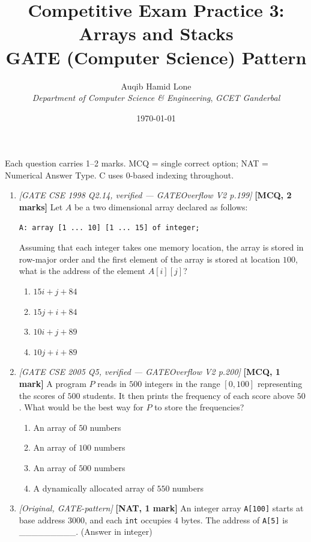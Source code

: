 \documentclass[11pt]{article}
\title{Competitive Exam Practice 3: Arrays and Stacks\\\large GATE (Computer Science) Pattern}
\author{Auqib Hamid Lone\\[0.3em]
  \emph{Department of Computer Science \& Engineering}, \emph{GCET Ganderbal}}
\date{\today}
\begin{document}
\maketitle

\noindent Each question carries 1--2 marks. MCQ = single correct option; NAT = Numerical Answer Type. C uses 0-based indexing throughout.

\begin{enumerate}
\item[\textbf{Q1}] \textit{[GATE CSE 1998 Q2.14, verified --- GATEOverflow V2 p.199]} \textbf{[MCQ, 2 marks]} Let $A$ be a two dimensional array declared as follows:
\begin{verbatim}
A: array [1 ... 10] [1 ... 15] of integer;
\end{verbatim}
Assuming that each integer takes one memory location, the array is stored in row-major order and the first element of the array is stored at location $100$, what is the address of the element $A[i][j]$?
\begin{enumerate}
  \item[(A)] $15i + j + 84$
  \item[(B)] $15j + i + 84$
  \item[(C)] $10i + j + 89$
  \item[(D)] $10j + i + 89$
\end{enumerate}

\item[\textbf{Q2}] \textit{[GATE CSE 2005 Q5, verified --- GATEOverflow V2 p.200]} \textbf{[MCQ, 1 mark]} A program $P$ reads in $500$ integers in the range $[0, 100]$ representing the scores of $500$ students. It then prints the frequency of each score above $50$. What would be the best way for $P$ to store the frequencies?
\begin{enumerate}
  \item[(A)] An array of $50$ numbers
  \item[(B)] An array of $100$ numbers
  \item[(C)] An array of $500$ numbers
  \item[(D)] A dynamically allocated array of $550$ numbers
\end{enumerate}

\item[\textbf{Q3}] \textit{[Original, GATE-pattern]} \textbf{[NAT, 1 mark]} An integer array \texttt{A[100]} starts at base address $3000$, and each \texttt{int} occupies $4$ bytes. The address of \texttt{A[5]} is \_\_\_\_\_\_\_\_\_. (Answer in integer)


\end{enumerate}
\end{document}
